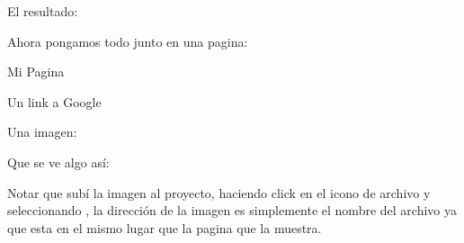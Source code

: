\documentclass[letterpaper,10pt,spanish]{sphinxmanual}
\begin{document}
El resultado:



Ahora pongamos todo junto en una pagina:

%
\begin{sphinxVerbatim}[commandchars=\\\{\}]
         
        Mi Pagina

        Un link a  Google

        Una imagen:

            
\end{sphinxVerbatim}

Que se ve algo así:

\begin{figure}[htbp]
\centering

\noindent{}
\end{figure}

Notar que subí la imagen al proyecto, haciendo click en el icono de
archivo y seleccionando , la dirección de la imagen es
simplemente el nombre del archivo ya que esta en el mismo lugar que la pagina
que la muestra.
\end{document}

